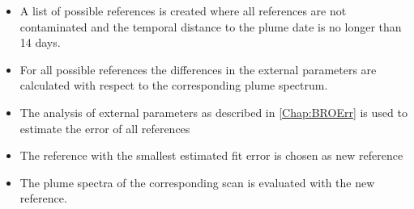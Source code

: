 \documentclass  [
  paper    = a4,
  BCOR     = 10mm,
  twoside,
  fontsize = 12pt,
  fleqn,
  toc      = bibnumbered,
  toc      = listofnumbered,
  numbers  = noendperiod,
  headings = normal,
  listof   = leveldown,
  version  = 3.03
]                                       {scrreprt}
\begin{document}
	\begin{itemize}
		\item A list of possible references is created where all references are not contaminated and the temporal distance to the plume date is no longer than 14 days.
		\item For all possible references the differences in the external parameters are calculated with respect to the corresponding plume spectrum.
		\item The analysis of external parameters as described in \cref{Chap:BROErr} is used to estimate the  error of all references
		\item The reference with the smallest estimated  fit error is chosen as new reference
		\item  The plume spectra of the corresponding scan is evaluated with the new reference.
	\end{itemize}
\end{document}
